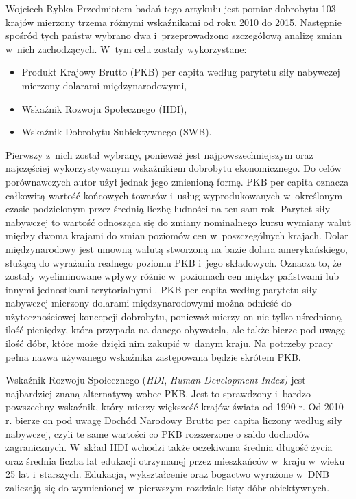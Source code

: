 \begin{artplenv}{Wojciech Rybka}
Przedmiotem badań tego artykułu jest pomiar dobrobytu 103 krajów mierzony trzema różnymi wskaźnikami od roku 2010 do
2015. Następnie spośród tych państw wybrano dwa i~przeprowadzono szczegółową analizę zmian w~nich zachodzących.
W~tym celu zostały wykorzystane: 

\begin{itemize}
\item Produkt Krajowy Brutto (PKB) per capita według parytetu siły nabywczej mierzony dolarami międzynarodowymi,
\item Wskaźnik Rozwoju Społecznego (HDI),
\item Wskaźnik Dobrobytu Subiektywnego (SWB).
\end{itemize}

Pierwszy z~nich został wybrany, ponieważ jest najpowszechniejszym oraz najczęściej wykorzystywanym wskaźnikiem dobrobytu
ekonomicznego. Do celów porównawczych autor użył jednak jego zmienioną formę. PKB per capita oznacza całkowitą wartość
końcowych towarów i~usług wyprodukowanych w~określonym czasie podzielonym przez średnią liczbę ludności na ten sam rok.
Parytet siły nabywczej to wartość odnosząca się do zmiany nominalnego kursu wymiany walut między dwoma krajami do zmian
poziomów cen w~poszczególnych krajach. Dolar międzynarodowy jest umowną walutą stworzoną na bazie dolara
amerykańskiego, służącą do wyrażania realnego poziomu PKB i~jego składowych. Oznacza to, że zostały wyeliminowane
wpływy różnic w~poziomach cen między państwami lub innymi jednostkami terytorialnymi
\parencite{international_monetary_fund_world_2019a}.
PKB per capita według parytetu siły nabywczej mierzony
dolarami międzynarodowymi można odnieść do użytecznościowej koncepcji dobrobytu, ponieważ mierzy on nie tylko
uśrednioną ilość pieniędzy, która przypada na danego obywatela, ale także bierze pod uwagę ilość dóbr, które może
dzięki nim zakupić w~danym kraju. Na potrzeby pracy pełna nazwa używanego wskaźnika zastępowana będzie skrótem PKB.

Wskaźnik Rozwoju Społecznego (\textit{HDI}, \textit{Human Development Index)} jest najbardziej znaną alternatywą wobec
PKB. Jest to sprawdzony i~bardzo powszechny wskaźnik, który mierzy większość krajów świata od 1990 r. Od 2010 r. bierze
on pod uwagę Dochód Narodowy Brutto per capita liczony według siły nabywczej, czyli te same wartości co PKB rozszerzone
o saldo dochodów zagranicznych. W~skład HDI wchodzi także oczekiwana średnia długość życia oraz średnia liczba lat
edukacji otrzymanej przez mieszkańców w~kraju w~wieku 25 lat i~starszych. Edukacja, wykształcenie oraz bogactwo
wyrażone w~DNB zaliczają się do wymienionej w~pierwszym rozdziale listy dóbr obiektywnych.


\end{artplenv}
